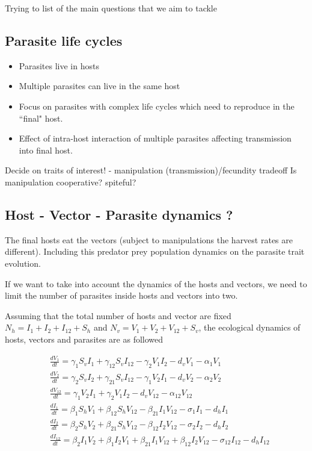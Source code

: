 \documentclass{article}
\begin{document}
Trying to list of the main questions that we aim to tackle
\subsection{Parasite life cycles}
\begin{itemize}
	\item Parasites live in hosts
	\item Multiple parasites can live in the same host
	\item Focus on parasites with complex life cycles which need to reproduce in the ``final" host.
	\item Effect of intra-host interaction of multiple parasites affecting transmission into final host. 
\end{itemize}

Decide on traits of interest! - manipulation (transmission)/fecundity tradeoff
Is manipulation cooperative? spiteful?

\subsection{Host - Vector - Parasite dynamics ?}

The final hosts eat the vectors (subject to manipulations the harvest rates are different).
Including this predator prey population dynamics on the parasite trait evolution.


If we want to take into account the dynamics of the hosts and vectors, we need to limit the number of parasites inside hosts and vectors into two.

Assuming that the total number of hosts and vector are fixed $N_h = I_1 + I_2 + I_{12} + S_h$ and $N_v = V_1 + V_2 + V_{12} + S_v$, the ecological dynamics of hosts, vectors and parasites are as followed

\begin{align*}
&  \frac{dV_1}{dt} = \gamma_1 S_v I_1  +  \gamma_{12} S_v I_{12}  - \gamma_2 V_1 I_2 - d_v V_1 - \alpha_1 V_1 \\
& \frac{dV_2}{dt} = \gamma_2 S_v I_2 + \gamma_{21} S_v I_{12} - \gamma_1 V_2 I_1 -   d_v V_2 - \alpha_2 V_2 \\
& \frac{dV_{12}}{dt} = \gamma_1 V_2 I_1 + \gamma_2 V_1 I_2  -   d_v V_{12} - \alpha_{12} V_{12}\\
& \frac{dI_1}{dt} = \beta_1 S_h V_1  + \beta_{12} S_h V_{12}  - \beta_{21}  I_1 V_{12} - \sigma_1 I_1  - d_h I_1\\
& \frac{dI_2}{dt} = \beta_2 S_h V_2 + \beta_{21} S_h V_{12} - \beta_{12} I_2 V_{12} - \sigma_2 I_2 - d_h I_2\\
& \frac{dI_{12}}{dt} = \beta_2 I_1 V_2 + \beta_1 I_2 V_1 + \beta_{21} I_1 V_{12} + \beta_{12} I_2 V_{12} - \sigma_{12} I_{12} - d_h I_{12}
\end{align*}
\end{document}
